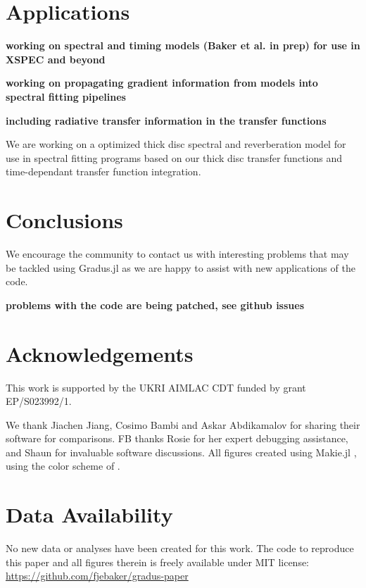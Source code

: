 \documentclass[fleqn,usenatbib]{mnras}
\newcommand{\todo}[1]{{\bf \color{red} #1}}
\newcommand{\Gradus}{Gradus.jl }
\begin{document}
\section{Applications}

\todo{working on spectral and timing models (Baker et al. in prep) for use in XSPEC and beyond}

\todo{working on propagating gradient information from models into spectral fitting pipelines}

\todo{including radiative transfer information in the transfer functions}

We are working on a optimized thick disc spectral and reverberation model for use in spectral fitting programs based on our thick disc transfer functions and time-dependant transfer function integration. 

\section{Conclusions}

We encourage the community to contact us with interesting problems that may be tackled using \Gradus as we are happy to assist with new applications of the code.

\todo{problems with the code are being patched, see github issues}


\section*{Acknowledgements}
This work is supported by the UKRI AIMLAC CDT funded by grant EP/S023992/1.

We thank Jiachen Jiang, Cosimo Bambi and Askar Abdikamalov for sharing their software for comparisons. FB thanks Rosie for her expert debugging assistance, and Shaun for invaluable software discussions. All figures created using Makie.jl \citep{DanischKrumbiegel2021}, using the color scheme of \cite{wong_points_2011}.

\section*{Data Availability}

No new data or analyses have been created for this work. The code to reproduce this paper and all figures therein is freely available under MIT license:
\url{https://github.com/fjebaker/gradus-paper}
\end{document}
